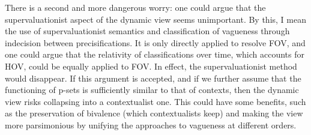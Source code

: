 There is a second and more dangerous worry: one could argue that the
supervaluationist aspect of the dynamic view seems unimportant. By this,
I mean the use of supervaluationist semantics and classification of
vagueness through indecision between precisifications. It is only
directly applied to resolve FOV, and one could argue that the relativity
of classifications over time, which accounts for HOV, could be equally
applied to FOV. In effect, the supervaluationist method would disappear.
If this argument is accepted, and if we further assume that the
functioning of p-sets is sufficiently similar to that of contexts, then
the dynamic view risks collapsing into a contextualist one. This could
have some benefits, such as the preservation of bivalence (which
contextualists keep) and making the view more parsimonious by unifying
the approaches to vagueness at different orders.

